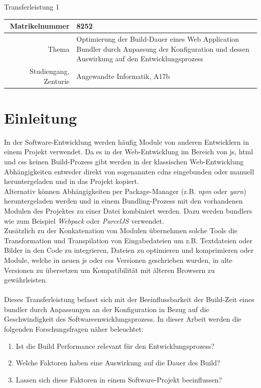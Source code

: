 \documentclass[11pt]{report}
\begin{document}
    {\huge Transferleistung 1}
    \vspace{1cm}

    \begin{center}
        \begin{tabularx}{\textwidth}{r|X}
            Matrikelnummer & 8252 \\\midrule
            Thema & Optimierung der Build-Dauer eines Web Application Bundler durch Anpassung der Konfiguration und dessen Auswirkung auf den Entwicklungsprozess \\\midrule
            Studiengang, Zenturie & Angewandte Informatik, A17b\
        \end{tabularx}
    \end{center}
    \pagebreak

    \tableofcontents
    \listoffigures
    \listoftables
    \pagebreak

    \chapter{Einleitung}
    	In der Software-Entwicklung werden häufig Module von anderen Entwicklern in einem Projekt verwendet. Da es in der Web-Entwicklung im Bereich von \Gls{js}, \Gls{html} und \Gls{css} keinen Build-Prozess gibt werden in der klassischen Web-Entwicklung Abhängigkeiten entweder direkt von sogenannten \Glspl{cdn} eingebunden oder manuell heruntergeladen und in das Projekt kopiert.\\
		Alternativ können Abhängigkeiten per Package-Manager (z.B. \emph{npm} oder \emph{yarn}) heruntergeladen werden und in einem Bundling-Prozess mit den vorhandenen Modulen des Projektes zu einer Datei kombiniert werden. Dazu werden \Glspl{bundler} wie zum Beispiel \emph{Webpack} oder \emph{ParcelJS} verwendet.\\
		Zusätzlich zu der Konkatenation von Modulen übernehmen solche Tools die Transformation und Transpilation von Eingabedateien um z.B. Textdateien oder Bilder in den Code zu integrieren, Dateien zu optimieren und komprimieren oder Module, welche in neuen \Gls{js} oder \Gls{css} Versionen geschrieben wurden, in alte Versionen zu übersetzen um Kompatibilität mit älteren Browsern zu gewährleisten.\\
		\\
    	Dieses Transferleistung befasst sich mit der Beeinflussbarkeit der Build-Zeit eines \Gls{bundler} durch Anpassungen an der Konfiguration in Bezug auf die Geschwindigkeit des Softwareenwicklungsprozess. In dieser Arbeit werden die folgenden Forschungsfragen näher beleuchtet:
	    	\begin{enumerate}
		    	\item Ist die Build Performance relevant für den Entwicklungsprozess? \label{question0}
		    	\item Welche Faktoren haben eine Auswirkung auf die Dauer des Build? \label{question1}
		    	\item Lassen sich diese Faktoren in einem Software-Projekt beeinflussen? \label{question2}
		    \end{enumerate}
		    
\end{document}

